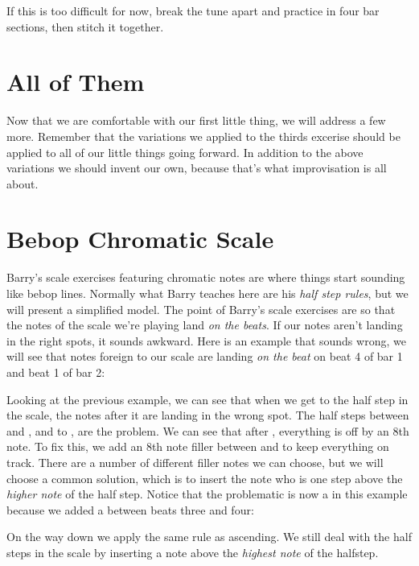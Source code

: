 If this is too difficult for now, break the tune apart and practice in four bar sections, then stitch it together.

\section{All of Them}
Now that we are comfortable with our first little thing, we will address a few more. Remember that the variations we applied to the thirds excerise should be applied to all of our little things going forward. In addition to the above variations we should invent our own, because that's what improvisation is all about.


\section{Bebop Chromatic Scale}
Barry's scale exercises featuring chromatic notes are where things start sounding like bebop lines. Normally what Barry teaches here are his \emph{half step rules}, but we will present a simplified model. The point of Barry's scale exercises are so that the notes of the scale we're playing land \emph{on the beats}. If our notes aren't landing in the right spots, it sounds awkward. Here is an example that sounds wrong, we will see that notes foreign to our scale are landing \emph{on the beat} on beat 4 of bar 1 and beat 1 of bar 2:


Looking at the previous example, we can see that when we get to the half step in the scale, the notes after it are landing in the wrong spot. The half steps between  and , and  to , are the problem. We can see that after , everything is off by an 8th note. To fix this, we add an 8th note filler between  and  to keep everything on track. There are a number of different filler notes we can choose, but we will choose a common solution, which is to insert the note who is one step above the \emph{higher note} of the half step. Notice that the problematic  is now a  in this example because we added a  between beats three and four:


On the way down we apply the same rule as ascending. We still deal with the half steps in the scale by inserting a note above the \emph{highest note} of the halfstep.


